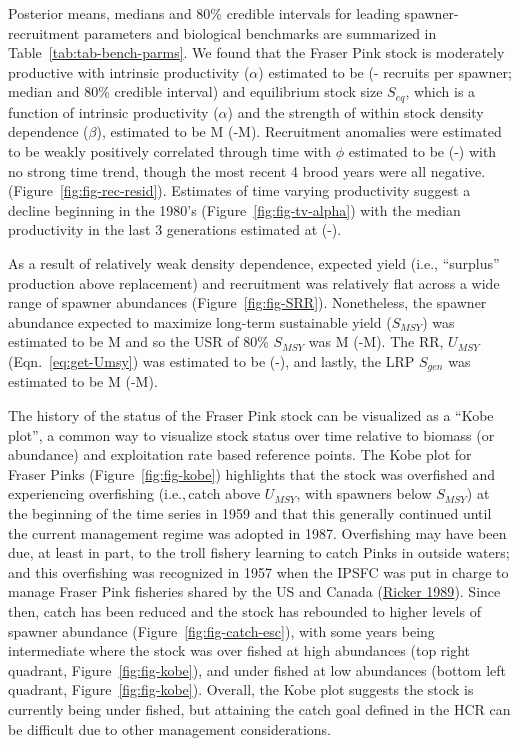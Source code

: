 \documentclass[french,11pt]{book}
\begin{document}
Posterior means, medians and 80\% credible intervals for leading spawner-recruitment parameters and biological benchmarks are summarized in Table~\ref{tab:tab-bench-parms}. We found that the Fraser Pink stock is moderately productive with intrinsic productivity (\(\alpha\)) estimated to be  (- recruits per spawner; median and 80\% credible interval) and equilibrium stock size \(S_{eq}\), which is a function of intrinsic productivity (\(\alpha\)) and the strength of within stock density dependence (\(\beta\)), estimated to be M (-M). Recruitment anomalies were estimated to be weakly positively correlated through time with \(\phi\) estimated to be  (-) with no strong time trend, though the most recent 4 brood years were all negative. (Figure~\ref{fig:fig-rec-resid}). Estimates of time varying productivity suggest a decline beginning in the 1980's (Figure~\ref{fig:fig-tv-alpha}) with the median productivity in the last 3 generations estimated at  (-).

As a result of relatively weak density dependence, expected yield (i.e., ``surplus'' production above replacement) and recruitment was relatively flat across a wide range of spawner abundances (Figure~\ref{fig:fig-SRR}). Nonetheless, the spawner abundance expected to maximize long-term sustainable yield (\(S_{MSY}\)) was estimated to be M and so the USR of 80\% \(S_{MSY}\) was M (-M). The RR, \(U_{MSY}\) (Eqn.~\ref{eq:get-Umsy}) was estimated to be  (-), and lastly, the LRP \(S_{gen}\) was estimated to be M (-M).

The history of the status of the Fraser Pink stock can be visualized as a ``Kobe plot'', a common way to visualize stock status over time relative to biomass (or abundance) and exploitation rate based reference points. The Kobe plot for Fraser Pinks (Figure~\ref{fig:fig-kobe}) highlights that the stock was overfished and experiencing overfishing (i.e.,\,catch above \(U_{MSY}\), with spawners below \(S_{MSY}\)) at the beginning of the time series in 1959 and that this generally continued until the current management regime was adopted in 1987. Overfishing may have been due, at least in part, to the troll fishery learning to catch Pinks in outside waters; and this overfishing was recognized in 1957 when the IPSFC was put in charge to manage Fraser Pink fisheries shared by the US and Canada (\protect\hyperlink{ref-rickerHistoryPresentState1989}{Ricker 1989}). Since then, catch has been reduced and the stock has rebounded to higher levels of spawner abundance (Figure~\ref{fig:fig-catch-esc}), with some years being intermediate where the stock was over fished at high abundances (top right quadrant, Figure~\ref{fig:fig-kobe}), and under fished at low abundances (bottom left quadrant, Figure~\ref{fig:fig-kobe}). Overall, the Kobe plot suggests the stock is currently being under fished, but attaining the catch goal defined in the HCR can be difficult due to other management considerations.
\end{document}
